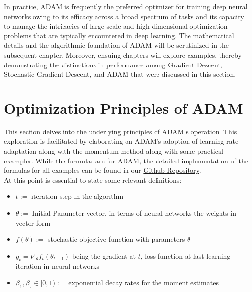 \documentclass[oneside]{article}
\begin{document}
In practice, ADAM is frequently the preferred optimizer for training deep neural networks owing to its efficacy across a broad spectrum of tasks and its capacity to manage the intricacies of large-scale and high-dimensional optimization problems that are typically encountered in deep learning. The mathematical details and the algorithmic foundation of ADAM will be scrutinized in the subsequent chapter. Moreover, ensuing chapters will explore examples, thereby demonstrating the distinctions in performance among Gradient Descent, Stochastic Gradient Descent, and ADAM that were discussed in this section.


\section{Optimization Principles of ADAM}
This section delves into the underlying principles of ADAM's operation. This exploration is facilitated by elaborating on ADAM's adoption of learning rate adaptation along with the momentum method along with some practical examples. While the formulas are for ADAM, the detailed implementation of the formulas for all examples can be found in our \href{https://github.com/jakthehut/ADAM-Optimizer}{Github Repository}.\\

At this point is essential to state some relevant definitions:
\begin{itemize}
    \item $t:=$ iteration step in the algorithm
    \item $\theta:=$ Initial Parameter vector, in terms of neural networks the weights in vector form
    \item $f(\theta):=$ stochastic objective function with parameters $\theta$
    \item $g_t= \nabla_{\theta} f_t(\theta_{t-1})$ being the gradient at $t$, loss function at last learning iteration in neural networks
    \item $\beta_1, \beta_2 \in [0,1) :=$ exponential decay rates for the moment estimates
\end{itemize}
\end{document}
